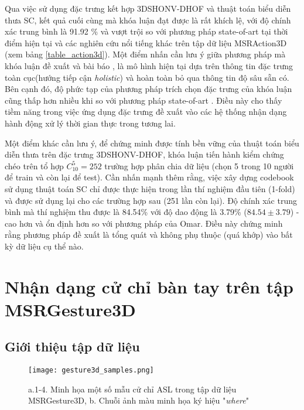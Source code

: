 Qua việc sử dụng đặc trưng kết hợp 3DSHONV-DHOF và thuật toán biểu diễn thưa SC, kết quả cuối cùng mà khóa luận đạt được là rất khích lệ, với độ chính xác trung bình là 91.92 \% và vượt trội so với phương pháp state-of-art tại thời điểm hiện tại và các nghiên cứu nổi tiếng khác trên tập dữ liệu MSRAction3D (xem bảng \ref{table_action3d}). Một điểm nhấn cần lưu ý giữa phương pháp mà khóa luận đề xuất và bài báo \cite{Wu_LOP2012}, \cite{WangLCCW12_ROP} là mô hình hiện tại dựa trên thông tin đặc trưng toàn cục(hướng tiếp cận \textit{holistic}) và hoàn toàn bỏ qua thông tin độ sâu sẵn có. Bên cạnh đó, độ phức tạp của phương pháp trích chọn đặc trưng của khóa luận cũng thấp hơn nhiều khi so với phương pháp state-of-art \cite{Omar_HON4D}. Điều này cho thấy tiềm năng trong việc ứng dụng đặc trưng đề xuất vào các hệ thống nhận dạng hành động xử lý thời gian thực trong tương lai. 

Một điểm khác cần lưu ý, để chứng minh được tính bền vững của thuật toán biểu diễn thưa trên đặc trưng 3DSHONV-DHOF, khóa luận tiến hành kiểm chứng chéo trên tổ hợp $C_{10}^5 = 252$ trường hợp phân chia dữ liệu (chọn 5 trong 10 người để train và còn lại để test). Cần nhấn mạnh thêm rằng, việc xây dựng codebook sử dụng thuật toán SC chỉ được thực hiện trong lần thí nghiệm đầu tiên (1-fold) và được sử dụng lại cho các trường hợp sau (251 lần còn lại). Độ chính xác trung bình mà thí nghiệm thu được là 84.54\% với độ dao động là 3.79\% ($84.54\pm 3.79$) - cao hơn và ổn định hơn so với phương pháp của Omar\cite{Omar_HON4D}. Điều này chứng minh rằng phương pháp đề xuất là tổng quát và không phụ thuộc (quá khớp) vào bất kỳ dữ liệu cụ thể nào.


\section{Nhận dạng cử chỉ bàn tay trên tập MSRGesture3D \cite{WangLCCW12_ROP}}
\subsection{Giới thiệu tập dữ liệu}
\begin{figure}
\centering
\texttt{[image: gesture3d\_samples.png]}
\caption{a.1-4. Minh họa một số mẫu cử chỉ ASL trong tập dữ liệu MSRGesture3D, b. Chuỗi ảnh màu minh họa ký hiệu "\textit{where}" \cite{WangLCCW12_ROP}}
\label{fig_gesture3d}
\end{figure}

